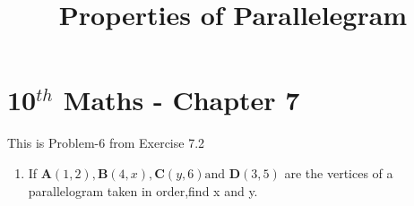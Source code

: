 \documentclass[12pt]{article}
\let\vec\mathbf
\begin{document}
\begin{center}
\title{\textbf{Properties of Parallelegram}}
\date{\vspace{-5ex}} %
\maketitle
\end{center}

\setcounter{page}{1}

\section{10$^{th}$ Maths - Chapter 7}

This is Problem-6 from Exercise 7.2

\begin{enumerate}
\item If $\vec{A}(1, 2),\vec{B}(4, x),\vec{C}(y, 6) \text{and } \vec{D}(3, 5)$ are the vertices of a parallelogram taken in order,find x and y.
\end{enumerate}
\end{document}
